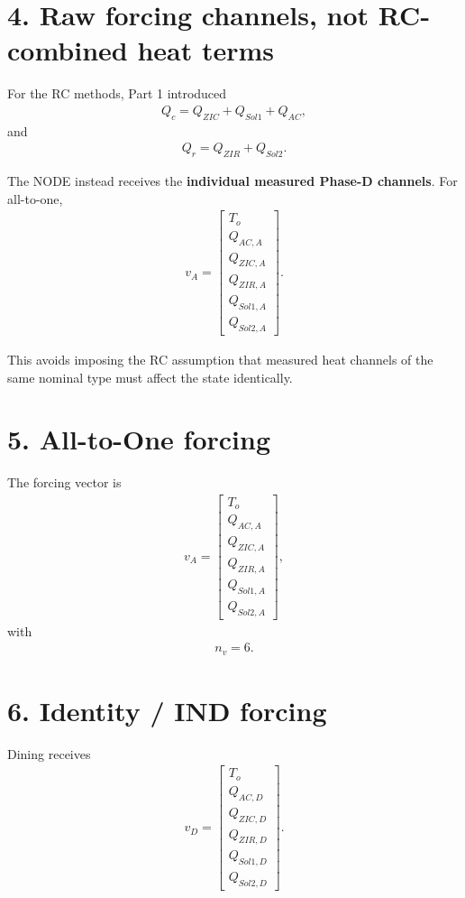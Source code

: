 \documentclass[11pt]{article}
\begin{document}
\section*{4. Raw forcing channels, not RC-combined heat terms}

For the RC methods, Part 1 introduced
\begin{align}
Q_c=Q_{ZIC}+Q_{Sol1}+Q_{AC},
\end{align}
and
\begin{align}
Q_r=Q_{ZIR}+Q_{Sol2}.
\end{align}

The NODE instead receives the \textbf{individual measured Phase-D channels}. For all-to-one,
\begin{align}
\boxed{
v_A=
\begin{bmatrix}
T_o\\
Q_{AC,A}\\
Q_{ZIC,A}\\
Q_{ZIR,A}\\
Q_{Sol1,A}\\
Q_{Sol2,A}
\end{bmatrix}.
}
\tag{N3.3}
\end{align}

This avoids imposing the RC assumption that measured heat channels of the same nominal type must affect the state identically.

\section*{5. All-to-One forcing}

The forcing vector is
\begin{align}
\boxed{
v_A=
\begin{bmatrix}
T_o\\
Q_{AC,A}\\
Q_{ZIC,A}\\
Q_{ZIR,A}\\
Q_{Sol1,A}\\
Q_{Sol2,A}
\end{bmatrix},
}
\tag{N3.4}
\end{align}
with
\begin{align}
n_v=6.
\end{align}

\section*{6. Identity / IND forcing}

Dining receives
\begin{align}
\boxed{
v_D=
\begin{bmatrix}
T_o\\
Q_{AC,D}\\
Q_{ZIC,D}\\
Q_{ZIR,D}\\
Q_{Sol1,D}\\
Q_{Sol2,D}
\end{bmatrix}.
}
\tag{N3.5}
\end{align}
\end{document}
